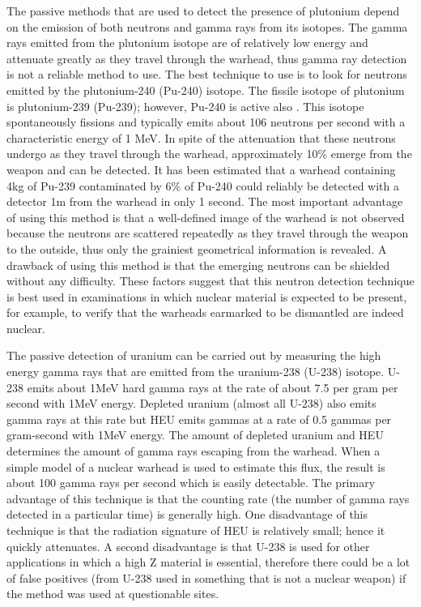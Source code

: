 \documentclass[twoside,titlepage,11pt,twocolumn,a4paper]{article}
\begin{document}
The passive methods that are used to detect the presence of plutonium
depend on the emission of both neutrons and gamma rays from its
isotopes. The gamma rays emitted from the plutonium isotope are of
relatively low energy and attenuate greatly as they travel through the
warhead, thus gamma ray detection is not a reliable method to use. The
best technique to use is to look for neutrons emitted by the
plutonium-240 (Pu-240) isotope. The fissile isotope of plutonium is
plutonium-239 (Pu-239); however, Pu-240 is active also
\citep{drell1993}. This isotope spontaneously fissions and typically
emits about 106 neutrons per second with a characteristic energy of 1
MeV. \citep{drell1993} In spite of the attenuation that these neutrons
undergo as they travel through the warhead, approximately 10\% emerge
from the weapon and can be detected. It has been estimated that a
warhead containing 4kg of Pu-239 contaminated by 6\% of Pu-240 could
reliably be detected with a detector 1m from the warhead in only 1
second. \citep{drell1993} The most important advantage of using this
method is that a well-defined image of the warhead is not observed
because the neutrons are scattered repeatedly as they travel through
the weapon to the outside, thus only the grainiest geometrical
information is revealed. \citep{drell1993,drell1990} A drawback of
using this method is that the emerging neutrons can be shielded
without any difficulty. These factors suggest that this neutron
detection technique is best used in examinations in which nuclear
material is expected to be present, for example, to verify that the
warheads earmarked to be dismantled are indeed nuclear.

The passive detection of uranium can be carried out by measuring the
high energy gamma rays that are emitted from the uranium-238 (U-238)
isotope. U-238 emits about 1MeV hard gamma rays at the rate of about
7.5 per gram per second with 1MeV energy. \citep{drell1993} Depleted
uranium (almost all U-238) also emits gamma rays at this rate but HEU
emits gammas at a rate of 0.5 gammas per gram-second with 1MeV
energy. The amount of depleted uranium and HEU determines the amount
of gamma rays escaping from the warhead. When a simple model of a
nuclear warhead is used to estimate this flux, the result is about 100
gamma rays per second which is easily detectable.  \citep{drell1993}
The primary advantage of this technique is that the counting rate
(the number of gamma rays detected in a particular time) is generally
high. One disadvantage of this technique is that the radiation
signature of HEU is relatively small; hence it quickly
attenuates. \citep{nuclearMatDet} A second disadvantage is that U-238
is used for other applications in which a high Z material is
essential, therefore there could be a lot of false positives (from
U-238 used in something that is not a nuclear weapon) if the method
was used at questionable sites.
\end{document}
